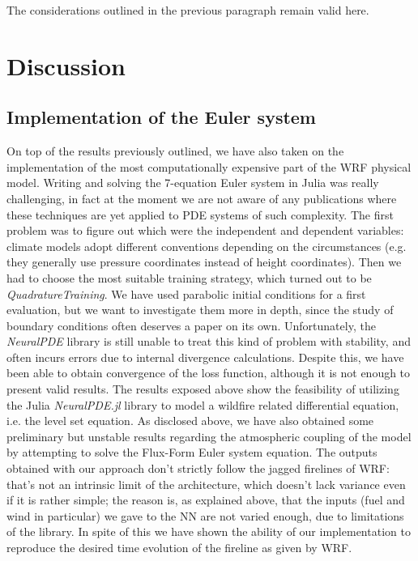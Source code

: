 \documentclass{juliacon}
\begin{document}
The considerations outlined in the previous paragraph remain valid here.

\section{Discussion}\label{discussion}

\subsection{Implementation of the Euler system}
On top of the results previously outlined, we have also taken on the implementation of the most computationally expensive part of the WRF physical model. Writing and solving the 7-equation Euler system in Julia was really challenging, in fact at the moment we are not aware of any publications where these techniques are yet applied to PDE systems of such complexity. The first problem was to figure out which were the independent and dependent variables: climate models adopt different conventions depending on the circumstances (e.g. they generally use pressure coordinates instead of height coordinates).
Then we had to choose the most suitable training strategy, which turned out to be \textit{QuadratureTraining}. We have used parabolic initial conditions for a first evaluation, but we want to investigate them more in depth, since the study of boundary conditions often deserves a paper on its own. Unfortunately, the \textit{NeuralPDE} library is still unable to treat this kind of problem with stability, and often incurs errors due to internal divergence calculations. Despite this, we have been able to obtain convergence of the loss function, although it is not enough to present valid results.
The results exposed above show the feasibility of utilizing the Julia \textit{NeuralPDE.jl} library to model a wildfire related differential equation, i.e. the level set equation. As disclosed above, we have also obtained some preliminary but unstable results regarding the atmospheric coupling of the model by attempting to solve the Flux-Form Euler system equation.
The outputs obtained with our approach don't strictly follow the jagged firelines of WRF: that's not an intrinsic limit of the architecture, which doesn't lack variance even if it is rather simple; the reason is, as explained above, that the inputs (fuel and wind in particular) we gave to the NN are not varied enough, due to limitations of the library.
In spite of this we have shown the ability of our implementation to reproduce the desired time evolution of the fireline as given by WRF.
\end{document}
